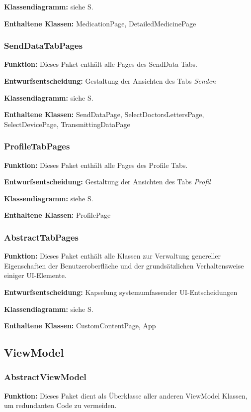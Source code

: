 \documentclass[a4paper]{scrreprt}
\begin{document}
\textbf{Klassendiagramm:} siehe S.

\textbf{Enthaltene Klassen:} MedicationPage, DetailedMedicinePage

\subsubsection{SendDataTabPages}
\textbf{Funktion:} Dieses Paket enthält alle Pages des SendData Tabs.

\textbf{Entwurfsentscheidung:} Gestaltung der Ansichten des Tabs \textit{Senden}

\textbf{Klassendiagramm:} siehe S.

\textbf{Enthaltene Klassen:} SendDataPage, SelectDoctorsLettersPage, SelectDevicePage, TransmittingDataPage

\subsubsection{ProfileTabPages}
\textbf{Funktion:} Dieses Paket enthält alle Pages des Profile Tabs.

\textbf{Entwurfsentscheidung:} Gestaltung der Ansichten des Tabs \textit{Profil}

\textbf{Klassendiagramm:} siehe S.

\textbf{Enthaltene Klassen:} ProfilePage

\subsubsection{AbstractTabPages}
\textbf{Funktion:} Dieses Paket enthält alle Klassen zur Verwaltung genereller Eigenschaften der Benutzeroberfläche und der grundsätzlichen Verhaltensweise einiger UI-Elemente.

\textbf{Entwurfsentscheidung:} Kapselung systemumfassender UI-Entscheidungen

\textbf{Klassendiagramm:} siehe S.

\textbf{Enthaltene Klassen:} CustomContentPage, App

\subsection{ViewModel}
\subsubsection{AbstractViewModel}
\textbf{Funktion:} Dieses Paket dient als Überklasse aller anderen ViewModel Klassen, um redundanten Code zu vermeiden.
\end{document}
